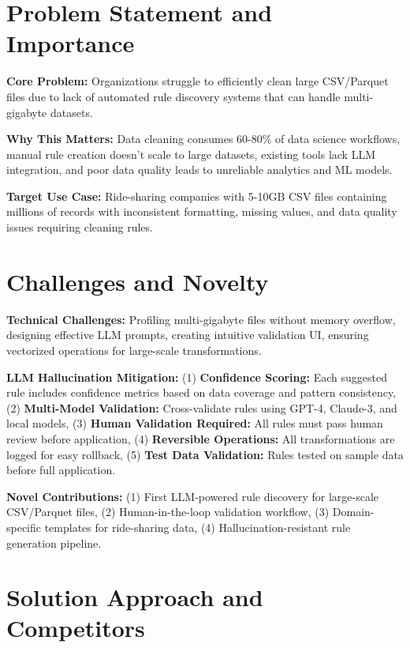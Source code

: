 \documentclass[11pt]{article}
\begin{document}
\section{\color{primaryblue}Problem Statement and Importance}

\textbf{Core Problem:} Organizations struggle to efficiently clean large CSV/Parquet files due to lack of automated rule discovery systems that can handle multi-gigabyte datasets.

\textbf{Why This Matters:} Data cleaning consumes 60-80\% of data science workflows, manual rule creation doesn't scale to large datasets, existing tools lack LLM integration, and poor data quality leads to unreliable analytics and ML models.

\textbf{Target Use Case:} Ride-sharing companies with 5-10GB CSV files containing millions of records with inconsistent formatting, missing values, and data quality issues requiring cleaning rules.

\section{\color{primaryblue}Challenges and Novelty}

\textbf{Technical Challenges:} Profiling multi-gigabyte files without memory overflow, designing effective LLM prompts, creating intuitive validation UI, ensuring vectorized operations for large-scale transformations.

\textbf{LLM Hallucination Mitigation:} (1) \textbf{Confidence Scoring:} Each suggested rule includes confidence metrics based on data coverage and pattern consistency, (2) \textbf{Multi-Model Validation:} Cross-validate rules using GPT-4, Claude-3, and local models, (3) \textbf{Human Validation Required:} All rules must pass human review before application, (4) \textbf{Reversible Operations:} All transformations are logged for easy rollback, (5) \textbf{Test Data Validation:} Rules tested on sample data before full application.

\textbf{Novel Contributions:} (1) First LLM-powered rule discovery for large-scale CSV/Parquet files, (2) Human-in-the-loop validation workflow, (3) Domain-specific templates for ride-sharing data, (4) Hallucination-resistant rule generation pipeline.

\section{\color{primaryblue}Solution Approach and Competitors}
\end{document}
